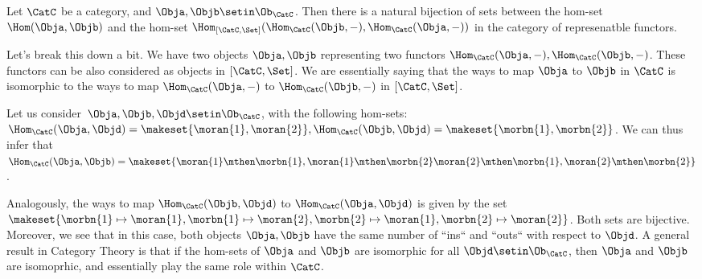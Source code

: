 {\begin{theorem}
    Let $\CatC$ be a category, and $\Obja, \Objb \setin \Ob_\CatC$.
    Then there is a natural bijection of sets between the hom-set $\Hom(\Obja,\Objb)$ and the hom-set $\Hom_{[\CatC, \Set]}(\Hom_\CatC(\Objb, -), \Hom_\CatC(\Obja, -))$ in the category of represenatble functors.
\end{theorem}
Let's break this down a bit.
We have two objects $\Obja, \Objb$ representing two functors $\Hom_\CatC(\Obja,-), \Hom_\CatC(\Objb,-)$.
These functors can be also considered as objects in $[\CatC, \Set]$.
We are essentially saying that the ways to map $\Obja$ to $\Objb$ in $\CatC$ is isomorphic to the ways to map $\Hom_\CatC(\Obja,-)$ to $ \Hom_\CatC(\Objb,-)$ in $[\CatC, \Set]$.

\begin{example}
    \begin{marginfigure}
        \centering
        \caption{\label{fig:rep-functor-1}}
    \end{marginfigure}

    \begin{marginfigure}
        \centering
        \caption{\label{fig:rep-functor-2}}
    \end{marginfigure}
    Let us consider~$\Obja, \Objb, \Objd \setin \Ob_\CatC$, with the following hom-sets: $\Hom_\CatC(\Obja, \Objd) = \makeset{\moran{1},\moran{2}}, \Hom_\CatC(\Objb, \Objd) = \makeset{\morbn{1},\morbn{2}}$.
    We can thus infer that $\Hom_\CatC(\Obja, \Objb) = \makeset{\moran{1}\mthen\morbn{1}, \moran{1}\mthen\morbn{2} \moran{2}\mthen\morbn{1}, \moran{2}\mthen\morbn{2}}$.

    Analogously, the ways to map $\Hom_\CatC(\Objb, \Objd)$ to $\Hom_\CatC(\Obja, \Objd)$ is given by the set $\makeset{\morbn{1} \mapsto \moran{1}, \morbn{1} \mapsto \moran{2}, \morbn{2} \mapsto \moran{1}, \morbn{2} \mapsto \moran{2}}$.
    Both sets are bijective.
    Moreover, we see that in this case, both objects $\Obja, \Objb$ have the same number of ``ins`` and ``outs`` with respect to $\Objd$.
    A general result in Category Theory is that if the hom-sets of $\Obja$ and $\Objb$ are isomorphic for all $\Objd \setin \Ob_\CatC$, then $\Obja$ and $\Objb$ are isomoprhic, and essentially play the same role within $\CatC$.
\end{example}
}
